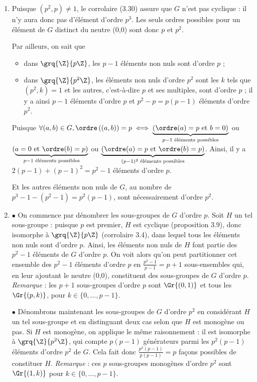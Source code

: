 
\begin{enumerate}
 \item Puisque $(p^2,p)\neq 1$, le corrolaire (3.30) assure que $G$ n'est pas cyclique : il n'y aura donc pas d'élément d'ordre $p^3$. Les seuls ordres possibles pour un élément de $G$ distinct du neutre (0,0) sont donc $p$ et $p^2$.
 
 Par ailleurs, on sait que
 \begin{itemize}
  \item dans $\grq{\Z}{p\Z}$, les $p-1$ éléments non nuls sont d'ordre $p$ ;
  \item dans $\grq{\Z}{p^2\Z}$, les éléments non nuls d'ordre $p^2$ sont les $k$ tels que $(p^2,k) = 1$ et les autres, c'est-à-dire $p$ et ses multiples, sont d'ordre $p$ ; il y a ainsi $p-1$ éléments d'ordre $p$ et $p^2-p = p(p-1)$ éléments d'ordre $p^2$.
 \end{itemize}

 Puisque $\forall (a,b)\in G, \ordre\left((a,b)\right) = p \iff \underbrace{(\ordre(a) = p \text{ et } b=0)}_{p-1 \text{ éléments possibles}}$ ou  $(\underbrace{a = 0 \text{ et } \ordre(b)=p)}_{p-1 \text{ éléments possibles}}$ ou $\underbrace{(\ordre(a) = p \text{ et } \ordre(b)=p)}_{(p-1)^2 \text{ éléments possibles}}$. Ainsi, il y a $2(p-1)+(p-1)^2 = p^2-1$ éléments d'ordre $p$.
 
 Et les autres éléments non nuls de $G$, au nombre de $p^3 - 1 - (p^2-1) = p^2(p-1)$, sont nécessairement d'ordre $p^2$.
 
 \item $\bullet$ On commence par dénombrer les sous-groupes de $G$ d'ordre $p$. Soit $H$ un tel sous-groupe : puisque $p$ est premier, $H$ est cyclique (proposition 3.9), donc isomorphe à $\grq{\Z}{p\Z}$ (corrolaire 3.4), dans lequel tous les éléments non nuls sont d'ordre $p$. Ainsi, les éléments non nuls de $H$ font partie des $p^2-1$ éléments de $G$ d'ordre $p$. On voit alors qu'on peut partitionner cet ensemble des $p^2-1$ éléments d'ordre $p$ en $\frac{p^2-1}{p-1}= p+1$ sous-ensembles qui, en leur ajoutant le neutre (0,0), constituent des sous-groupes de $G$ d'ordre $p$. \textit{Remarque} : les $p+1$ sous-groupes d'ordre $p$ sont $\Gr{(0,1)}$ et tous les $\Gr{(p,k)}$, pour $k\in \{0,\ldots, p-1\}$.
 
 $\bullet$ Dénombrons maintenant les sous-groupes de $G$ d'ordre $p^2$ en considérant $H$ un tel sous-groupe et en distinguant deux cas selon que $H$ est monogène ou pas. Si $H$ est monogène, on applique le même raisonnement : il est isomorphe à $\grq{\Z}{p^2\Z}$, qui compte $p(p-1)$ générateurs parmi les $p^2(p-1)$ éléments d'ordre $p^2$ de $G$. Cela fait donc $\frac{p^2(p-1)}{p(p-1)} = p$ façons possibles de constituer $H$. \textit{Remarque} : ces $p$ sous-groupes monogènes d'ordre $p^2$ sont $\Gr{ (1,k)}$ pour $k\in \{0,\ldots, p-1\}$.
 

\end{enumerate}
